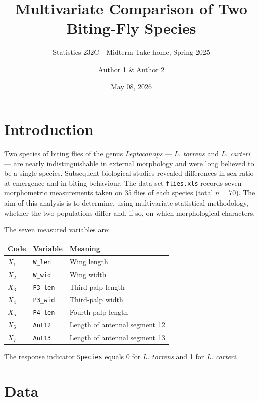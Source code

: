 \documentclass[
  11pt,
]{article}
\title{Multivariate Comparison of Two Biting-Fly Species}
\subtitle{Statistics 232C - Midterm Take-home, Spring 2025}
\author{Author 1 \& Author 2}
\date{May 08, 2026}
\newcounter{none} %
\begin{document}
\maketitle

{
\setcounter{tocdepth}{3}
\tableofcontents
}
\section{Introduction}\label{introduction}

Two species of biting flies of the genus \emph{Leptoconops} --- \emph{L.
torrens} and \emph{L. carteri} --- are nearly indistinguishable in
external morphology and were long believed to be a single species.
Subsequent biological studies revealed differences in sex ratio at
emergence and in biting behaviour. The data set \texttt{flies.xls}
records seven morphometric measurements taken on 35 flies of each
species (total \(n = 70\)). The aim of this analysis is to determine,
using multivariate statistical methodology, whether the two populations
differ and, if so, on which morphological characters.

The seven measured variables are:

{\def\LTcaptype{none} %
\begin{longtable}[]{@{}lll@{}}
\toprule\noalign{}
Code & Variable & Meaning \\
\midrule\noalign{}
\endhead
\bottomrule\noalign{}
\endlastfoot
\(X_1\) & \texttt{W\_len} & Wing length \\
\(X_2\) & \texttt{W\_wid} & Wing width \\
\(X_3\) & \texttt{P3\_len} & Third-palp length \\
\(X_4\) & \texttt{P3\_wid} & Third-palp width \\
\(X_5\) & \texttt{P4\_len} & Fourth-palp length \\
\(X_6\) & \texttt{Ant12} & Length of antennal segment 12 \\
\(X_7\) & \texttt{Ant13} & Length of antennal segment 13 \\
\end{longtable}
}

The response indicator \texttt{Species} equals 0 for \emph{L. torrens}
and 1 for \emph{L. carteri}.

\section{Data}\label{data}
\end{document}
